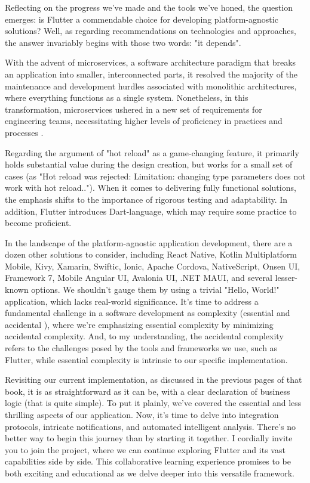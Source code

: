 
Reflecting on the progress we've made and the tools we've honed, the question emerges: is Flutter a commendable 
choice for developing platform-agnostic solutions? Well, as regarding recommendations on technologies and approaches, 
the answer invariably begins with those two words: "it depends".

With the advent of microservices, a software architecture paradigm that breaks an application into smaller, 
interconnected parts, it resolved the majority of the maintenance and development hurdles associated with monolithic 
architectures, where everything functions as a single system. Nonetheless, in this transformation, microservices 
ushered in a new set of requirements for engineering teams, necessitating higher levels of proficiency in practices 
and processes \cite{Mugr23}.

Regarding the argument of "hot reload" as a game-changing feature, it primarily holds substantial value during the 
design creation, but works for a small set of cases (as "Hot reload was rejected: Limitation: changing type parameters 
does not work with hot reload.."). When it comes to delivering fully functional solutions, the emphasis shifts to the 
importance of rigorous testing and adaptability. In addition, Flutter introduces Dart-language, which may require 
some practice to become proficient.

In the landscape of the platform-agnostic application development, there are a dozen other solutions to consider,
including React Native, Kotlin Multiplatform Mobile, Kivy, Xamarin, Swiftic, Ionic, Apache Cordova, NativeScript,
Onsen UI, Framework 7, Mobile Angular UI, Avalonia UI, .NET MAUI, and several lesser-known options. We shouldn't gauge
them by using a trivial "Hello, World!" application, which lacks real-world significance. It's time to address a
fundamental challenge in a software development as complexity (essential and accidental \cite{Broo87}), where we're
emphasizing essential complexity by minimizing accidental complexity. And, to my understanding, the accidental
complexity refers to the challenges posed by the tools and frameworks we use, such as Flutter, while essential
complexity is intrinsic to our specific implementation.

Revisiting our current implementation, as discussed in the previous pages of that book, it is as 
straightforward as it can be, with a clear declaration of business logic (that is quite simple). To put it plainly, 
we've covered the essential and less thrilling aspects of our application. Now, it's time to delve into integration 
protocols, intricate notifications, and automated intelligent analysis. There's no better way to begin this journey 
than by starting it together. I cordially invite you to join the project, where we can continue exploring Flutter and 
its vast capabilities side by side. This collaborative learning experience promises to be both exciting and educational 
as we delve deeper into this versatile framework.
